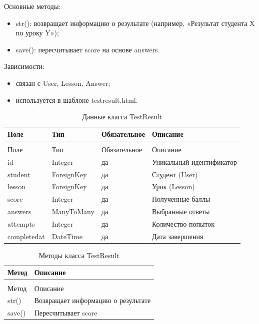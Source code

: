 Основные методы:
	\begin{itemize}
		\item str(): возвращает информацию о результате (например, «Результат студента X по уроку Y»);
		\item save(): пересчитывает score на основе answers.
	\end{itemize}
	
Зависимости:
	\begin{itemize}
		\item связан с User, Lesson, Answer;
		\item используется в шаблоне testresult.html.
	\end{itemize}


\begin{xltabular}{\textwidth}{|l|l|l|X|}
	\caption{Данные класса TestResult\label{tab:testresult_attributes}}\\
	\hline
	Поле & Тип & Обязательное & Описание \\ \hline
	\endfirsthead
	\\
	\hline
	Поле & Тип & Обязательное & Описание \\ \hline
	\endhead
	id & Integer & да & Уникальный идентификатор \\ \hline
	student & ForeignKey & да & Студент (User) \\ \hline
	lesson & ForeignKey & да & Урок (Lesson) \\ \hline
	score & Integer & да & Полученные баллы \\ \hline
	answers & ManyToMany & да & Выбранные ответы \\ \hline
	attempts & Integer & да & Количество попыток \\ \hline
	completedat & DateTime & да & Дата завершения \\ \hline
\end{xltabular}

\begin{xltabular}{\textwidth}{|l|X|}
	\caption{Методы класса TestResult\label{tab:testresult_methods}}\\
	\hline
	Метод & Описание \\ \hline
	\endfirsthead
	\\
	\hline
	Метод & Описание \\ \hline
	\endhead
	str() & Возвращает информацию о результате \\ \hline
	save() & Пересчитывает score \\ \hline
\end{xltabular}

